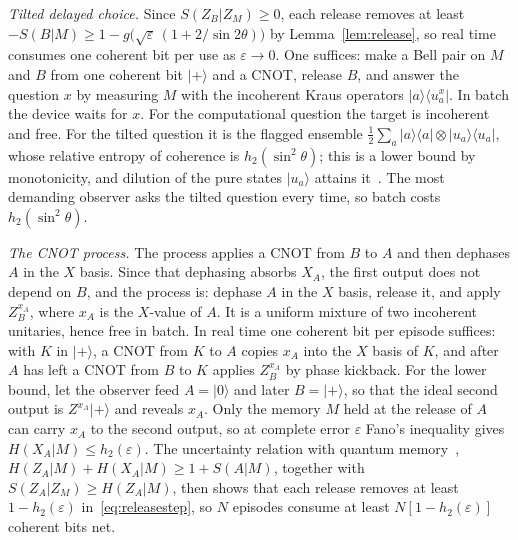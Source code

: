 \documentclass[11pt]{article}
\theoremstyle{definition}
\theoremstyle{remark}
\begin{document}
\emph{Tilted delayed choice.} Since $S(Z_B|Z_M)\ge0$, each release removes at least $-S(B|M)\ge1-g\bigl(\sqrt\varepsilon\,(1+2/\sin2\theta)\bigr)$ by Lemma~\ref{lem:release}, so real time consumes one coherent bit per use as $\varepsilon\to0$. One suffices: make a Bell pair on $M$ and $B$ from one coherent bit $|+\rangle$ and a CNOT, release $B$, and answer the question $x$ by measuring $M$ with the incoherent Kraus operators $|a\rangle\langle u^x_a|$. In batch the device waits for $x$. For the computational question the target is incoherent and free. For the tilted question it is the flagged ensemble $\tfrac12\sum_a|a\rangle\langle a|\otimes|u_a\rangle\langle u_a|$, whose relative entropy of coherence is $h_2(\sin^2\theta)$; this is a lower bound by monotonicity, and dilution of the pure states $|u_a\rangle$ attains it~\cite{WinterYang16}. The most demanding observer asks the tilted question every time, so batch costs $h_2(\sin^2\theta)$.

\emph{The CNOT process.} The process applies a CNOT from $B$ to $A$ and then dephases $A$ in the $X$ basis. Since that dephasing absorbs $X_A$, the first output does not depend on $B$, and the process is: dephase $A$ in the $X$ basis, release it, and apply $Z_B^{x_A}$, where $x_A$ is the $X$-value of $A$. It is a uniform mixture of two incoherent unitaries, hence free in batch. In real time one coherent bit per episode suffices: with $K$ in $|+\rangle$, a CNOT from $K$ to $A$ copies $x_A$ into the $X$ basis of $K$, and after $A$ has left a CNOT from $B$ to $K$ applies $Z_B^{x_A}$ by phase kickback. For the lower bound, let the observer feed $A=|0\rangle$ and later $B=|+\rangle$, so that the ideal second output is $Z^{x_A}|+\rangle$ and reveals $x_A$. Only the memory $M$ held at the release of $A$ can carry $x_A$ to the second output, so at complete error $\varepsilon$ Fano's inequality gives $H(X_A|M)\le h_2(\varepsilon)$. The uncertainty relation with quantum memory~\cite{BCCRR10}, $H(Z_A|M)+H(X_A|M)\ge1+S(A|M)$, together with $S(Z_A|Z_M)\ge H(Z_A|M)$, then shows that each release removes at least $1-h_2(\varepsilon)$ in~\eqref{eq:releasestep}, so $N$ episodes consume at least $N[1-h_2(\varepsilon)]$ coherent bits net.
\end{document}
